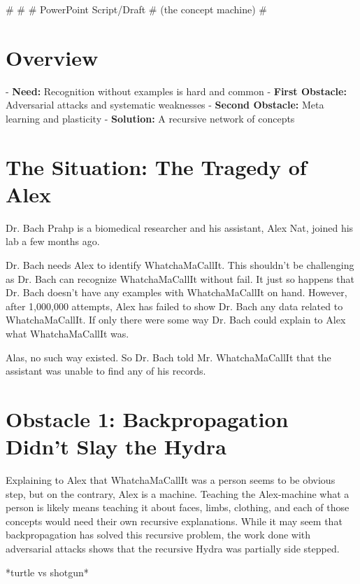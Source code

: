 \documentclass{article}
\newcommand{\br}{ \hfill \break}
\begin{document}
%
%
%
\# \br
\# \br 
\# PowerPoint Script/Draft \br
\# (the concept machine) \br 
\# \br
\date{April 20 2020} \br
\begin{adjustwidth}{2.5em}{0pt}



\section{Overview}

- \textbf{Need:} Recognition without examples is hard and common\br
- \textbf{First Obstacle:} Adversarial attacks and systematic weaknesses\br
- \textbf{Second Obstacle:} Meta learning and plasticity\br
- \textbf{Solution:} A recursive network of concepts\br

\section{The Situation: The Tragedy of Alex}

Dr. Bach Prahp is a biomedical researcher and his assistant, Alex Nat, joined his lab a few months ago. \br

Dr. Bach needs Alex to identify WhatchaMaCallIt. This shouldn't be challenging as Dr. Bach can recognize WhatchaMaCallIt without fail. It just so happens that Dr. Bach doesn't have any examples with WhatchaMaCallIt on hand. However, after 1,000,000 attempts, Alex has failed to show Dr. Bach any data related to WhatchaMaCallIt. If only there were some way Dr. Bach could explain to Alex what WhatchaMaCallIt was. \br

Alas, no such way existed. So Dr. Bach told Mr. WhatchaMaCallIt that the assistant was unable to find any of his records. \br
 
\section{Obstacle 1: Backpropagation Didn't Slay the Hydra}

Explaining to Alex that WhatchaMaCallIt was a person seems to be obvious step, but on the contrary, Alex is a machine. Teaching the Alex-machine what a person is likely means teaching it about faces, limbs, clothing, and each of those concepts would need their own recursive explanations. While it may seem that backpropagation has solved this recursive problem, the work done with adversarial attacks shows that the recursive Hydra was partially side stepped.

*turtle vs shotgun*


\end{adjustwidth}
\end{document}
